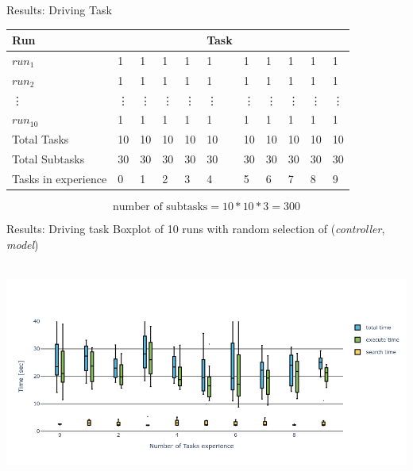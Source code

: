 
\begin{frame}[fragile]{Results: Driving Task} 
\begin{table}[H]
    \centering
    \begin{tabular}%
    {l | p{0.3cm} p{0.3cm} p{0.3cm} p{0.3cm} p{0.3cm} p{0.3cm} p{0.3cm} p{0.3cm}p{0.3cm} p{0.3cm}}
  Run &  &   &  &  & Task &  &  &  &  & \\ \hline
  $\mathit{run}_1$ & 1 & 1  & 1 & 1 & 1 & 1 & 1 & 1 & 1 & 1\\
  $\mathit{run}_2$ & 1 & 1  & 1 & 1 & 1 & 1 & 1 & 1 & 1 & 1\\
  \quad\vdots &\vdots & \vdots  & \vdots & \vdots & \vdots & \vdots & \vdots & \vdots & \vdots & \vdots\\
  $\mathit{run}_{10}$ & 1 & 1  & 1 & 1 & 1 & 1 & 1 & 1 & 1 & 1\\\hline
    Total Tasks& 10 & 10  & 10 & 10 & 10 & 10 & 10 & 10 & 10 & 10\\
    Total Subtasks & 30 & 30  & 30 & 30 & 30 & 30 & 30 & 30 & 30 & 30\\\hline
    Tasks in experience & 0 & 1 & 2 & 3 &4 & 5 &6 & 7& 8  &9\\ 
    \end{tabular}
\end{table}\pause

\[\textrm{number of subtasks} = 10 * 10 * 3 = 300\]
\end{frame}


\begin{frame}[fragile]{Results: Driving task} 
Boxplot of 10 runs with random selection of (\textit{controller}, \textit{model})
\vspace{-1cm}
\begin{center}
  \hbox{\hspace{-0.7cm} \includegraphics[width=1.05\textwidth]{figures/results/random_drive_time_no_k-graph} }
\end{center}
\end{frame}

